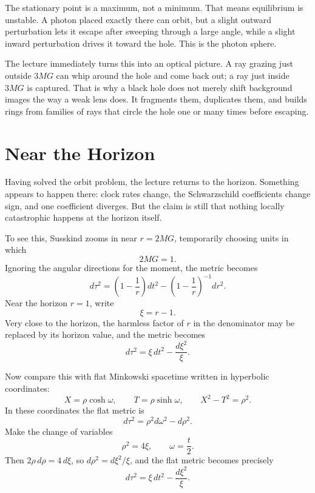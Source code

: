 The stationary point is a maximum, not a minimum. That means equilibrium is unstable. A photon placed exactly there can orbit, but a slight outward perturbation lets it escape after sweeping through a large angle, while a slight inward perturbation drives it toward the hole. This is the photon sphere.

The lecture immediately turns this into an optical picture. A ray grazing just outside \(3MG\) can whip around the hole and come back out; a ray just inside \(3MG\) is captured. That is why a black hole does not merely shift background images the way a weak lens does. It fragments them, duplicates them, and builds rings from families of rays that circle the hole one or many times before escaping.

\section{Near the Horizon}

Having solved the orbit problem, the lecture returns to the horizon. Something appears to happen there: clock rates change, the Schwarzschild coefficients change sign, and one coefficient diverges. But the claim is still that nothing locally catastrophic happens at the horizon itself.

To see this, Susskind zooms in near \(r=2MG\), temporarily choosing units in which
\begin{equation}
2MG=1.
\end{equation}
Ignoring the angular directions for the moment, the metric becomes
\begin{equation}
d\tau^{2}
=
\left(1-\frac{1}{r}\right)dt^{2}
-
\left(1-\frac{1}{r}\right)^{-1}dr^{2}.
\end{equation}
Near the horizon \(r=1\), write
\begin{equation}
\xi=r-1.
\end{equation}
Very close to the horizon, the harmless factor of \(r\) in the denominator may be replaced by its horizon value, and the metric becomes
\begin{equation}
d\tau^{2}
=
\xi\,dt^{2}
-
\frac{d\xi^{2}}{\xi}.
\end{equation}

Now compare this with flat Minkowski spacetime written in hyperbolic coordinates:
\begin{equation}
X=\rho\cosh\omega,
\qquad
T=\rho\sinh\omega,
\qquad
X^{2}-T^{2}=\rho^{2}.
\end{equation}
In these coordinates the flat metric is
\begin{equation}
d\tau^{2}
=
\rho^{2}d\omega^{2}-d\rho^{2}.
\end{equation}
Make the change of variables
\begin{equation}
\rho^{2}=4\xi,
\qquad
\omega=\frac{t}{2}.
\end{equation}
Then \(2\rho\,d\rho=4\,d\xi\), so \(d\rho^{2}=d\xi^{2}/\xi\), and the flat metric becomes precisely
\begin{equation}
d\tau^{2}
=
\xi\,dt^{2}
-
\frac{d\xi^{2}}{\xi}.
\end{equation}


